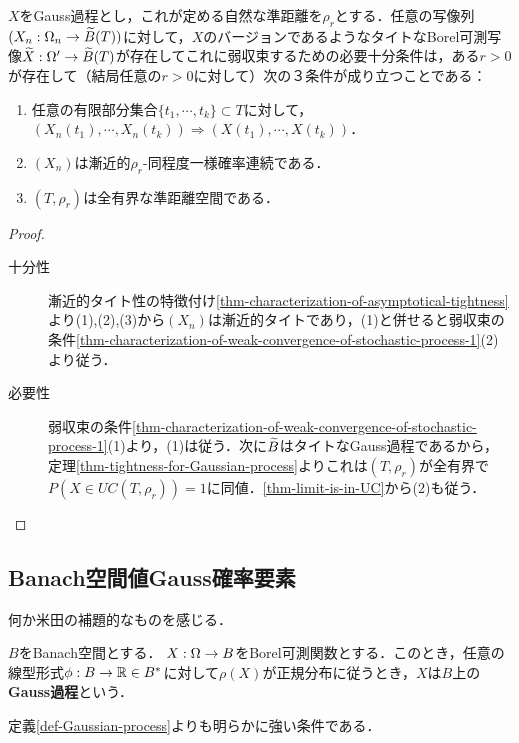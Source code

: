 \documentclass[uplatex,dvipdfmx]{jsreport}
\begin{document}
\begin{corollary}[タイトなGauss過程に弱収束する条件の特徴付け３]\label{cor-characterization-of-weak-convergence-of-Gaussian-Process}
    $X$をGauss過程とし，これが定める自然な準距離を$\rho_r$とする．任意の写像列$(X_n:\Omega_n\to\widetilde{B}(T))$に対して，$X$のバージョンであるようなタイトなBorel可測写像$\widetilde{X}:\Omega'\to\widetilde{B}(T)$が存在してこれに弱収束するための必要十分条件は，ある$r>0$が存在して（結局任意の$r>0$に対して）次の３条件が成り立つことである：
    \begin{enumerate}
        \item 任意の有限部分集合$\{t_1,\cdots,t_k\}\subset T$に対して，$(X_n(t_1),\cdots,X_n(t_k))\Rightarrow(X(t_1),\cdots,X(t_k))$．
        \item $(X_n)$は漸近的$\rho_r$-同程度一様確率連続である．
        \item $(T,\rho_r)$は全有界な準距離空間である．
    \end{enumerate}
\end{corollary}
\begin{proof}\mbox{}
    \begin{description}
        \item[十分性] 漸近的タイト性の特徴付け\ref{thm-characterization-of-asymptotical-tightness}より(1),(2),(3)から$(X_n)$は漸近的タイトであり，(1)と併せると弱収束の条件\ref{thm-characterization-of-weak-convergence-of-stochastic-process-1}(2)より従う．
        \item[必要性] 弱収束の条件\ref{thm-characterization-of-weak-convergence-of-stochastic-process-1}(1)より，(1)は従う．次に$\widetilde{B}$はタイトなGauss過程であるから，定理\ref{thm-tightness-for-Gaussian-process}よりこれは$(T,\rho_r)$が全有界で$P(X\in UC(T,\rho_r))=1$に同値．\ref{thm-limit-is-in-UC}から(2)も従う．
    \end{description}
\end{proof}

\subsection{Banach空間値Gauss確率要素}

\begin{tcolorbox}[colframe=ForestGreen, colback=ForestGreen!10!white,breakable,colbacktitle=ForestGreen!40!white,coltitle=black,fonttitle=\bfseries\sffamily,
title=]
    何か米田の補題的なものを感じる．
\end{tcolorbox}

\begin{definition}
    $B$をBanach空間とする．
    $X:\Omega\to B$をBorel可測関数とする．このとき，任意の線型形式$\phi:B\to\mathbb{R}\in B^*$に対して$\rho(X)$が正規分布に従うとき，$X$は$B$上の\textbf{Gauss過程}という．
\end{definition}
\begin{remark}
    定義\ref{def-Gaussian-process}よりも明らかに強い条件である．
\end{remark}
\end{document}
